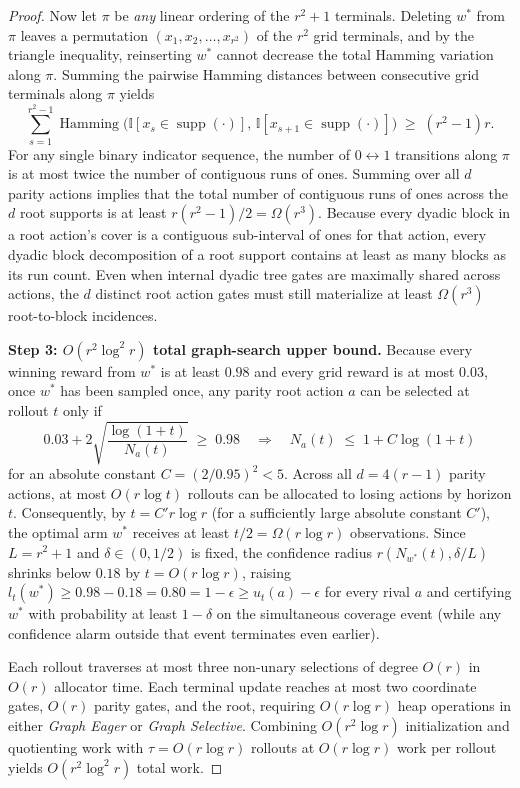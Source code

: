 \documentclass{article}
\theoremstyle{plain}
\theoremstyle{definition}
\begin{document}
\begin{proof}
Now let $\pi$ be \emph{any} linear ordering of the $r^2 + 1$ terminals. Deleting $w^*$ from $\pi$ leaves a permutation $(x_1, x_2, \dots, x_{r^2})$ of the $r^2$ grid terminals, and by the triangle inequality, reinserting $w^*$ cannot decrease the total Hamming variation along $\pi$. Summing the pairwise Hamming distances between consecutive grid terminals along $\pi$ yields
\[
\sum_{s=1}^{r^2 - 1} \operatorname{Hamming}\bigl(\mathbb{I}[x_s \in \operatorname{supp}(\cdot)],\, \mathbb{I}[x_{s+1} \in \operatorname{supp}(\cdot)]\bigr) \;\ge\; (r^2 - 1) r.
\]
For any single binary indicator sequence, the number of $0 \leftrightarrow 1$ transitions along $\pi$ is at most twice the number of contiguous runs of ones. Summing over all $d$ parity actions implies that the total number of contiguous runs of ones across the $d$ root supports is at least $r(r^2 - 1)/2 = \Omega(r^3)$. Because every dyadic block in a root action's cover is a contiguous sub-interval of ones for that action, every dyadic block decomposition of a root support contains at least as many blocks as its run count. Even when internal dyadic tree gates are maximally shared across actions, the $d$ distinct root action gates must still materialize at least $\Omega(r^3)$ root-to-block incidences.

\medskip\noindent\textbf{Step 3: $O(r^2 \log^2 r)$ total graph-search upper bound.}
Because every winning reward from $w^*$ is at least $0.98$ and every grid reward is at most $0.03$, once $w^*$ has been sampled once, any parity root action $a$ can be selected at rollout $t$ only if
\[
0.03 + 2\sqrt{\frac{\log(1+t)}{N_a(t)}} \;\ge\; 0.98 \quad\Longrightarrow\quad N_a(t) \;\le\; 1 + C \log(1+t)
\]
for an absolute constant $C = (2/0.95)^2 < 5$. Across all $d = 4(r-1)$ parity actions, at most $O(r \log t)$ rollouts can be allocated to losing actions by horizon $t$. Consequently, by $t = C' r \log r$ (for a sufficiently large absolute constant $C'$), the optimal arm $w^*$ receives at least $t/2 = \Omega(r \log r)$ observations. Since $L = r^2 + 1$ and $\delta \in (0, 1/2)$ is fixed, the confidence radius $r(N_{w^*}(t), \delta/L)$ shrinks below $0.18$ by $t = O(r \log r)$, raising $l_t(w^*) \ge 0.98 - 0.18 = 0.80 = 1 - \epsilon \ge u_t(a) - \epsilon$ for every rival $a$ and certifying $w^*$ with probability at least $1 - \delta$ on the simultaneous coverage event (while any confidence alarm outside that event terminates even earlier).

Each rollout traverses at most three non-unary selections of degree $O(r)$ in $O(r)$ allocator time. Each terminal update reaches at most two coordinate gates, $O(r)$ parity gates, and the root, requiring $O(r \log r)$ heap operations in either \emph{Graph Eager} or \emph{Graph Selective}. Combining $O(r^2 \log r)$ initialization and quotienting work with $\tau = O(r \log r)$ rollouts at $O(r \log r)$ work per rollout yields $O(r^2 \log^2 r)$ total work.
\end{proof}
\end{document}
